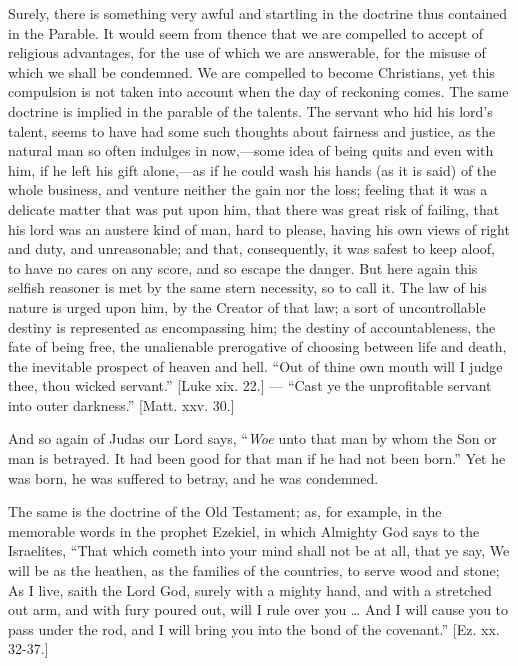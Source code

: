 Surely, there is something very awful and
startling in the doctrine thus contained in the Parable. It would seem
from thence that we are compelled to accept of religious advantages,
for the use of which we are answerable, for the misuse of which we
shall be condemned. We are compelled to become Christians, yet this
compulsion is not taken into account when the day of reckoning comes.
The same doctrine is implied in the parable of the talents. The
servant who hid his lord's talent, seems to have had some such
thoughts about fairness and justice, as the natural man so often
indulges in now,—some idea of being quits and even with him, if he
left his gift alone,—as if he could wash his hands (as it is said)
of the whole business, and venture neither the gain nor the loss;
feeling that it was a delicate matter that was put upon him, that
there was great risk of failing, that his lord was an austere kind of
man, hard to please, having his own views of right and duty, and
unreasonable; and that, consequently, it was safest to keep aloof, to
have no cares on any score, and so escape the danger. But here again
this selfish reasoner is met by the same stern necessity, so to call
it. The law of his nature is urged upon him, by the Creator of that
law; a sort of uncontrollable destiny is represented as encompassing
him; the destiny of accountableness, the fate of being free, the
unalienable prerogative of choosing between life and death, the
inevitable prospect of heaven and hell. ``Out of thine own mouth
will I judge thee, thou wicked servant.'' [Luke xix. 22.] —
``Cast ye the unprofitable servant into outer darkness.''
[Matt. xxv. 30.]

And so again of Judas our Lord says, ``\emph{Woe} unto that man
by whom the Son or man is betrayed. It had been good for that man if
he had not been born.'' Yet he was born, he was suffered to
betray, and he was condemned.

The same is the doctrine of the Old Testament; as, for example, in
the memorable words in the prophet Ezekiel, in which Almighty God says
to the Israelites, ``That which cometh into your mind shall not be
at all, that ye say, We will be as the heathen, as the families of the
countries, to serve wood and stone; As I live, saith the Lord God,
surely with a mighty hand, and with a stretched out arm, and with fury
poured out, will I rule over you … And I will cause you to pass
under the rod, and I will bring you into the bond of the
covenant.'' [Ez. xx. 32-37.]

